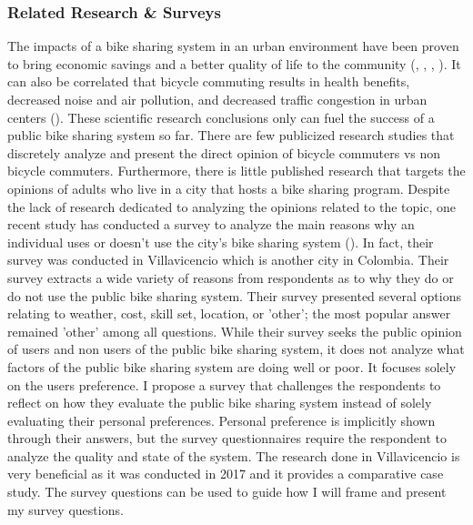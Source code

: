 \documentclass[12pt]{article}
\begin{document}
\subsubsection*{Related Research \& Surveys}
The impacts of a bike sharing system in an urban environment have been proven to bring economic savings and a better quality of life to the community (\cite{DeliotteReport}, \cite{zuluaga_garcía_2017}, \cite{midgley_2011}, \cite{dávalos_maldonado_polit_2016}). It can also be correlated that bicycle commuting results in health benefits, decreased noise and air pollution, and decreased traffic congestion in urban centers (\cite{DeliotteReport}). These scientific research conclusions only can fuel the success of a public bike sharing system so far. There are few publicized research studies that discretely analyze and present the direct opinion of bicycle commuters vs non bicycle commuters. Furthermore, there is little published research that targets the opinions of adults who live in a city that hosts a bike sharing program. Despite the lack of research dedicated to analyzing the opinions related to the topic, one recent study has conducted a survey to analyze the main reasons why an individual uses or doesn't use the city's bike sharing system (\cite{PublicOpinPBS}). In fact, their survey was conducted in Villavicencio which is another city in Colombia. Their survey extracts a wide variety of reasons from respondents as to why they do or do not use the public bike sharing system. Their survey presented several options relating to weather, cost, skill set, location, or 'other'; the most popular answer remained 'other' among all questions. While their survey seeks the public opinion of users and non users of the public bike sharing system, it does not analyze what factors of the public bike sharing system are doing well or poor. It focuses solely on the users preference. I propose a survey that challenges the respondents to reflect on how they evaluate the public bike sharing system instead of solely evaluating their personal preferences. Personal preference is implicitly shown through their answers, but the survey questionnaires require the respondent to analyze the quality and state of the system. The research done in Villavicencio is very beneficial as it was conducted in 2017 and it provides a comparative case study. The survey questions can be used to guide how I will frame and present my survey questions.
\end{document}
